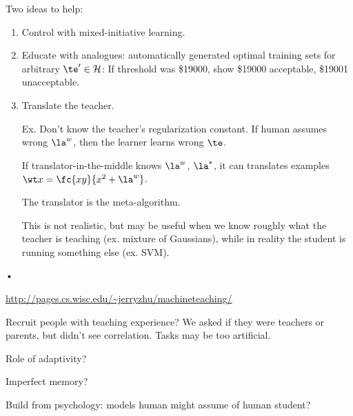 Two ideas to help:
\begin{enumerate}
\item
Control with mixed-initiative learning.
\item
Educate with analogues: automatically generated optimal training sets for arbitrary $\te'\in \cal H$: If threshold was \$19000, show \$19000 acceptable, \$19001 unacceptable.
\item
Translate the teacher.

Ex. Don't know the teacher's regularization constant. If human assumes wrong $\la^w$, then the learner learns wrong $\te$.

If translator-in-the-middle knows $\la^w$, $\la^*$, it can translates examples $\wt x = \fc{xy}{x^2+\la^w}$.

The translator is the meta-algorithm.

This is not realistic, but may be useful when we know roughly what the teacher is teaching (ex. mixture of Gaussians), while in reality the student is running something else (ex. SVM).
\end{enumerate}•

\url{http://pages.cs.wisc.edu/\~jerryzhu/machineteaching/}

Recruit people with teaching experience? We asked if they were teachers or parents, but didn't see correlation. Tasks may be too artificial.

Role of adaptivity?


Imperfect memory?

Build from psychology: models human might assume of human student?


